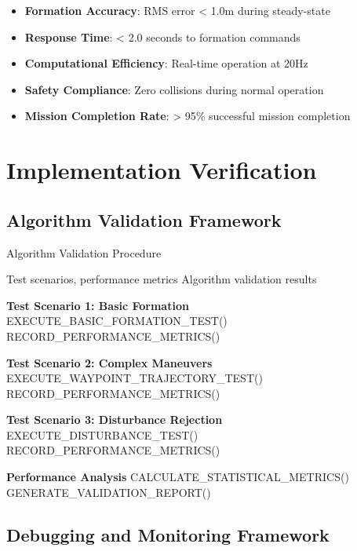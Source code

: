 \documentclass[11pt,a4paper]{article}
\begin{document}
\begin{itemize}
    \item \textbf{Formation Accuracy}: RMS error < 1.0m during steady-state
    \item \textbf{Response Time}: < 2.0 seconds to formation commands
    \item \textbf{Computational Efficiency}: Real-time operation at 20Hz
    \item \textbf{Safety Compliance}: Zero collisions during normal operation
    \item \textbf{Mission Completion Rate}: > 95\% successful mission completion
\end{itemize}

\section{Implementation Verification}

\subsection{Algorithm Validation Framework}

\begin{algorithm}[H]
\caption{Algorithm Validation Procedure}
\label{alg:validation}
\begin{algorithmic}[1]
\Require Test scenarios, performance metrics
\Ensure Algorithm validation results

\State \textbf{Test Scenario 1: Basic Formation}
    \State EXECUTE\_BASIC\_FORMATION\_TEST()
    \State RECORD\_PERFORMANCE\_METRICS()
\EndFor

\State \textbf{Test Scenario 2: Complex Maneuvers}
    \State EXECUTE\_WAYPOINT\_TRAJECTORY\_TEST()
    \State RECORD\_PERFORMANCE\_METRICS()
\EndFor

\State \textbf{Test Scenario 3: Disturbance Rejection}
    \State EXECUTE\_DISTURBANCE\_TEST()
    \State RECORD\_PERFORMANCE\_METRICS()
\EndFor

\State \textbf{Performance Analysis}
\State CALCULATE\_STATISTICAL\_METRICS()
\State GENERATE\_VALIDATION\_REPORT()
\end{algorithmic}
\end{algorithm}

\subsection{Debugging and Monitoring Framework}
\end{document}
